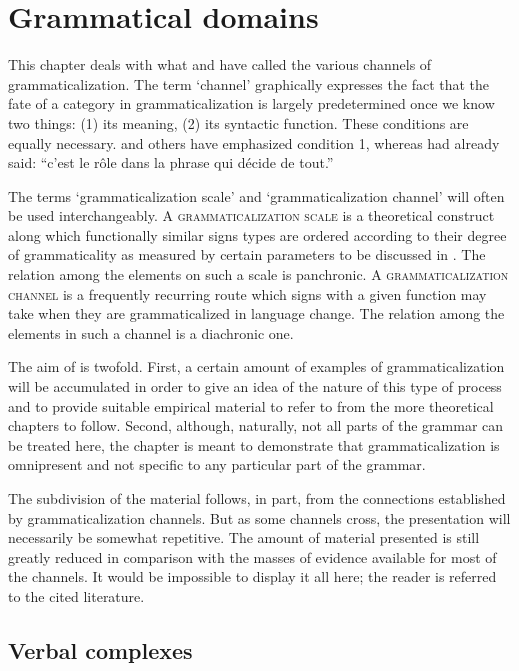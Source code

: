 \chapter{Grammatical domains} \label{chap:3}

This chapter deals with what \citet{Givón1979b} and \citet{HeineEtAl1984} have called the various channels of grammaticalization. The term ‘channel’ graphically expresses the fact that the fate of a category in grammaticalization is largely predetermined once we know two things: (1) its meaning, (2) its syntactic function. These conditions are equally necessary. \citet[213f]{Givón1979a} and others have emphasized condition 1, whereas \citet[170]{Meillet1915} had already said: “c'est le rôle dans la phrase qui décide de tout.”

The terms ‘grammaticalization scale’ and ‘grammaticalization channel’ will often be used interchangeably. A \textsc{grammaticalization scale} is a theoretical construct along which functionally similar signs types are ordered according to their degree of grammaticality as measured by certain parameters to be discussed in . The relation among the elements on such a scale is panchronic. A \textsc{grammaticalization channel} is a frequently recurring route which signs with a given function may take when they are grammaticalized in language change. The relation among the elements in such a channel is a diachronic one.

The aim of  is twofold. First, a certain amount of examples of grammaticalization will be accumulated in order to give an idea of the nature of this type of process and to provide suitable empirical material to refer to from the more theoretical chapters to follow. Second, although, naturally, not all parts of the grammar can be treated here, the chapter is meant to demonstrate that grammaticalization is omnipresent and not specific to any particular part of the grammar.

The subdivision of the material follows, in part, from the connections established by grammaticalization channels. But as some channels cross, the presentation will necessarily be somewhat repetitive. The amount of material presented is still greatly reduced in comparison with the masses of evidence available for most of the channels. It would be impossible to display it all here; the reader is referred to the cited literature.

\section{Verbal complexes}

